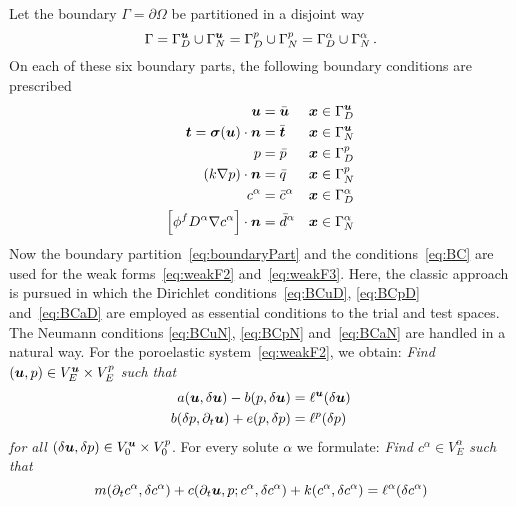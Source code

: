 \documentclass[a4paper,DIV=12,10pt]{scrartcl}
\newcommand{\U}[0]{\vek{u}}
\newcommand{\x}[0]{\vek{x}}
\begin{document}
Let the boundary $\Gamma = \partial \Omega$ be partitioned in a disjoint way
\begin{equation}
  \label{eq:boundaryPart}
  \Gamma = \Gamma^{\U}_D \cup \Gamma^{\U}_N = \Gamma^p_D \cup \Gamma^p_N
  = \Gamma^\alpha_D \cup \Gamma^\alpha_N\,.
\end{equation}
On each of these six boundary parts, the following boundary conditions are
prescribed 
\begin{subequations} \label{eq:BC}
  \begin{align}
    \U &= \bar{\U} &\x &\in \Gamma_D^{\U} \label{eq:BCuD} \\
    \vek{t} = \vek{\sigma}(\U) \cdot \vek{n} &= \bar{\vek{t}}
    &\x &\in \Gamma_N^{\U} \label{eq:BCuN} \\
    p &= \bar{p}  &\x &\in \Gamma_D^p \label{eq:BCpD} \\
    (k \nabla p) \cdot \vek{n} &= \bar{q}
    &\x &\in \Gamma_N^p \label{eq:BCpN} \\
    c^\alpha &= \bar{c}^\alpha &\x &\in \Gamma_D^\alpha \label{eq:BCaD} \\
    \left[\phi^f D^\alpha \nabla c^\alpha \right] \cdot \vek{n} &=
    \bar{d}^\alpha 
    &\x &\in \Gamma_N^\alpha \label{eq:BCaN} 
  \end{align}
\end{subequations}
Now the boundary partition~\eqref{eq:boundaryPart} and the
conditions~\eqref{eq:BC} are used for the weak forms~\eqref{eq:weakF2}
and~\eqref{eq:weakF3}. Here, the classic approach is pursued in which the
Dirichlet conditions~\eqref{eq:BCuD}, \eqref{eq:BCpD} and~\eqref{eq:BCaD} are
employed as essential conditions to the trial and test spaces. The Neumann
conditions \eqref{eq:BCuN}, \eqref{eq:BCpN} and~\eqref{eq:BCaN} are handled in
a natural way. For the poroelastic system~\eqref{eq:weakF2}, we obtain:
\emph{Find $(\U, p) \in V^{\U}_E \times V^p_E$ such that}
\begin{equation}
  \label{eq:wfPoro}
  \begin{aligned}
    a( \U, \delta \U) - b( p, \delta \U )&= \ell^{\U} (\delta \U) \\
    b( \delta p, \partial_t \U) + e( p, \delta p ) &= \ell^p (\delta p)
  \end{aligned}
\end{equation}
\emph{for all $(\delta \U, \delta p) \in V^{\U}_0 \times V^p_0$}.
For every solute $\alpha$ we formulate:
\emph{Find $c^\alpha \in V^\alpha_E$ such that}
\begin{equation}
  \label{eq:wfAlpha}
  m( \partial_t c^\alpha, \delta c^\alpha) + c( \partial_t \U, p; c^\alpha, \delta
  c^\alpha ) + k( c^\alpha, \delta c^\alpha ) = \ell^\alpha (\delta c^\alpha) 
\end{equation}
\end{document}

